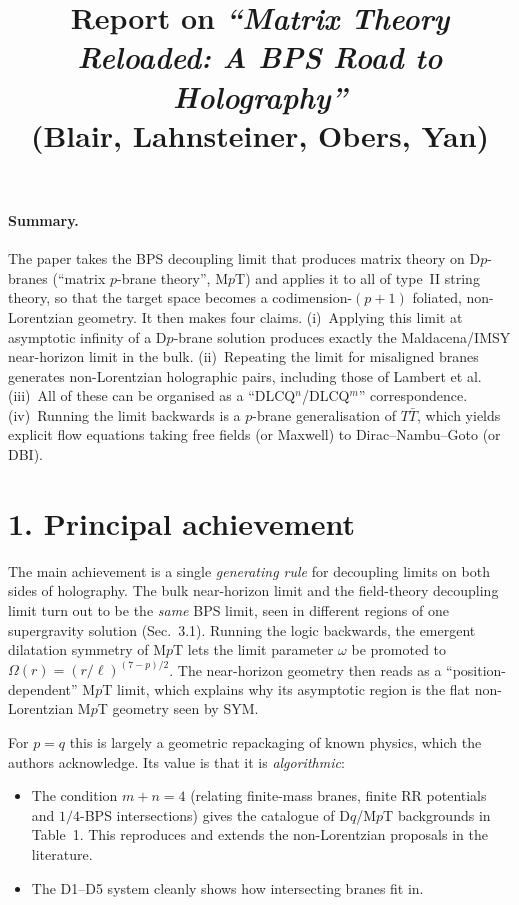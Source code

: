 \documentclass[11pt]{article}
\title{Report on \emph{``Matrix Theory Reloaded: A BPS Road to Holography''}\\[2pt]
\large (Blair, Lahnsteiner, Obers, Yan)}
\author{}
\date{}
\begin{document}
\maketitle
\vspace{-2.5em}

\paragraph{Summary.}
The paper takes the BPS decoupling limit that produces matrix theory on D$p$-branes
(``matrix $p$-brane theory'', M$p$T) and applies it to all of type~II string theory,
so that the target space becomes a codimension-$(p{+}1)$ foliated, non-Lorentzian geometry.
It then makes four claims.
(i)~Applying this limit at asymptotic infinity of a D$p$-brane solution produces exactly the
Maldacena/IMSY near-horizon limit in the bulk.
(ii)~Repeating the limit for misaligned branes generates non-Lorentzian holographic pairs,
including those of Lambert et al.
(iii)~All of these can be organised as a ``DLCQ$^n$/DLCQ$^m$'' correspondence.
(iv)~Running the limit backwards is a $p$-brane generalisation of $T\bar T$, which yields
explicit flow equations taking free fields (or Maxwell) to Dirac--Nambu--Goto (or DBI).

\section*{1. Principal achievement}

The main achievement is a single \emph{generating rule} for decoupling limits on both sides of
holography. The bulk near-horizon limit and the field-theory decoupling limit turn out to be the
\emph{same} BPS limit, seen in different regions of one supergravity solution
(Sec.~3.1). Running the logic backwards, the emergent dilatation symmetry of M$p$T lets
the limit parameter $\omega$ be promoted to $\Omega(r)=(r/\ell)^{(7-p)/2}$. The near-horizon
geometry then reads as a ``position-dependent'' M$p$T limit, which explains why its asymptotic
region is the flat non-Lorentzian M$p$T geometry seen by SYM.

For $p=q$ this is largely a geometric repackaging of known physics, which the authors
acknowledge. Its value is that it is \emph{algorithmic}:
\begin{itemize}
\item The condition $m+n=4$ (relating finite-mass branes, finite RR potentials and $1/4$-BPS
intersections) gives the catalogue of D$q$/M$p$T backgrounds in Table~1. This reproduces and
extends the non-Lorentzian proposals in the literature.
\item The D1--D5 system cleanly shows how intersecting branes fit in.
\end{itemize}
\end{document}
